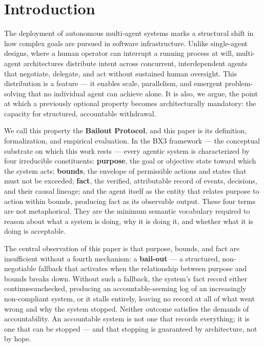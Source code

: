 \section{Introduction}

The deployment of autonomous multi-agent systems marks a structural shift in how complex goals are pursued in software infrastructure. Unlike single-agent designs, where a human operator can interrupt a running process at will, multi-agent architectures distribute intent across concurrent, interdependent agents that negotiate, delegate, and act without sustained human oversight. This distribution is a feature — it enables scale, parallelism, and emergent problem-solving that no individual agent can achieve alone. It is also, we argue, the point at which a previously optional property becomes architecturally mandatory: the capacity for structured, accountable withdrawal.

We call this property the \textbf{Bailout Protocol}, and this paper is its definition, formalization, and empirical evaluation. In the BX3 framework --- the conceptual substrate on which this work rests --- every agentic system is characterized by four irreducible constituents: \textbf{purpose}, the goal or objective state toward which the system acts; \textbf{bounds}, the envelope of permissible actions and states that must not be exceeded; \textbf{fact}, the verified, attributable record of events, decisions, and their causal lineage; and the agent itself as the entity that relates purpose to action within bounds, producing fact as its observable output. These four terms are not metaphorical. They are the minimum semantic vocabulary required to reason about what a system is doing, why it is doing it, and whether what it is doing is acceptable.

The central observation of this paper is that purpose, bounds, and fact are insufficient without a fourth mechanism: a \textbf{bail-out} --- a structured, non-negotiable fallback that activates when the relationship between purpose and bounds breaks down. Without such a fallback, the system's fact record either continuesunchecked, producing an accountable-seeming log of an increasingly non-compliant system, or it stalls entirely, leaving no record at all of what went wrong and why the system stopped. Neither outcome satisfies the demands of accountability. An accountable system is not one that records everything; it is one that can be stopped --- and that stopping is guaranteed by architecture, not by hope.

